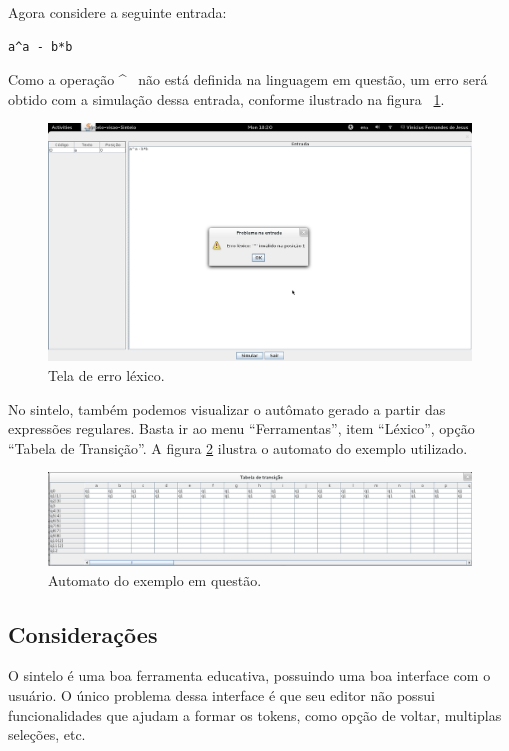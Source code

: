 Agora considere a seguinte entrada:
\begin{verbatim}
a^a - b*b
\end{verbatim}

Como a operação \^~ não está definida na linguagem em questão, um erro será obtido com a simulação dessa entrada, conforme ilustrado na figura ~\ref{sintelo-lexico-erro}. 

\begin{figure}[ht!]
	\centering
	\includegraphics[scale=0.28]{imgs/sintelo-lexico-erro}
	\caption{Tela de erro léxico.}
	\label{sintelo-lexico-erro}
\end{figure}

No sintelo, também podemos visualizar o autômato gerado a partir das expressões regulares. Basta ir ao menu ``Ferramentas'', item ``Léxico'', opção ``Tabela de Transição''. A figura \ref{sintelo-lexico-automatan} ilustra o automato do exemplo utilizado.

\begin{figure}[ht!]
	\centering
	\includegraphics[scale=0.28]{imgs/sintelo-lexico-automatan}
	\caption{Automato do exemplo em questão.}
	\label{sintelo-lexico-automatan}
\end{figure}

\subsection{Considerações} %
\label{sub:consideracoes}
O sintelo é uma boa ferramenta educativa, possuindo uma boa interface com o usuário. O único problema dessa interface é que seu editor não possui funcionalidades que ajudam a formar os tokens, como opção de voltar, multiplas seleções, etc.


